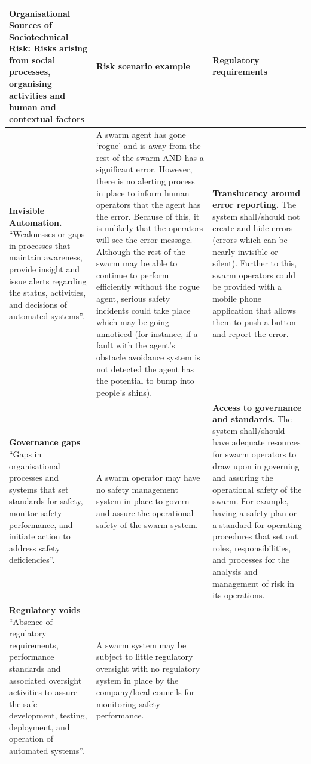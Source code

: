 \documentclass[lettersize,journal]{IEEEtran}
\begin{document}
\begin{landscape}
\begin{table}[]
    \centering
    \begin{tabular}{|p{0.3\textheight}|p{0.35\textheight}|p{0.35\textheight}|}
    \hline
   \textbf{Organisational Sources of Sociotechnical Risk:} Risks arising from social processes, organising activities and human and contextual factors & \textbf{Risk scenario example} & \textbf{Regulatory requirements}\\
   \hline
   \textbf{Invisible Automation.} ``Weaknesses or gaps in processes that maintain awareness, provide insight and issue alerts regarding the status, activities, and decisions of automated systems”. \cite{macrae2021learning} & A swarm agent has gone ‘rogue’ and is away from the rest of the swarm AND has a significant error. However, there is no alerting process in place to inform human operators that the agent has the error. Because of this, it is unlikely that the operators will see the error message. Although the rest of the swarm may be able to continue to perform efficiently without the rogue agent, serious safety incidents could take place which may be going unnoticed (for instance, if a fault with the agent’s obstacle avoidance system is not detected the agent has the potential to bump into people’s shins).	& \textbf{Translucency around error reporting.} The system shall/should not create and hide errors (errors which can be nearly invisible or silent). Further to this, swarm operators could be provided with a mobile phone application that allows them to push a button and report the error.\\
   \hline
   \textbf{Governance gaps} ``Gaps in organisational processes and systems that set standards for safety, monitor safety performance, and initiate action to address safety deficiencies”. \cite{macrae2021learning} & A swarm operator may have no safety management system in place to govern and assure the operational safety of the swarm system. &\textbf{Access to governance and standards.} The system shall/should have adequate resources for swarm operators to draw upon in governing and assuring the operational safety of the swarm. For example, having a safety plan or a standard for operating procedures that set out roles, responsibilities, and processes for the analysis and management of risk in its operations.
   \\
   \hline
   \textbf{Regulatory voids} ``Absence of regulatory requirements, performance standards and associated oversight activities to assure the safe development, testing, deployment, and operation of automated systems”. \cite{macrae2021learning} & A swarm system may be subject to little regulatory oversight with no regulatory system in place by the company/local councils for monitoring safety performance.&

\end{tabular}
\end{table}
\end{landscape}
\end{document}
